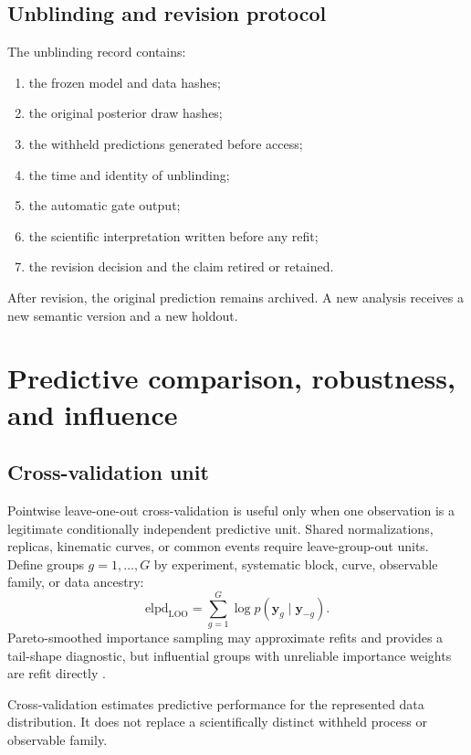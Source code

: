 \documentclass[11pt]{article}
\newcommand{\LOO}{\ensuremath{\mathrm{LOO}}}
\begin{document}
\subsection{Unblinding and revision protocol}

The unblinding record contains:
\begin{enumerate}
\item the frozen model and data hashes;
\item the original posterior draw hashes;
\item the withheld predictions generated before access;
\item the time and identity of unblinding;
\item the automatic gate output;
\item the scientific interpretation written before any refit;
\item the revision decision and the claim retired or retained.
\end{enumerate}
After revision, the original prediction remains archived.  A new analysis
receives a new semantic version and a new holdout.

\section{Predictive comparison, robustness, and influence}
\label{sec:model-comparison}

\subsection{Cross-validation unit}

Pointwise leave-one-out cross-validation is useful only when one observation
is a legitimate conditionally independent predictive unit.  Shared
normalizations, replicas, kinematic curves, or common events require
leave-group-out units.  Define groups \(g=1,\ldots,G\) by experiment,
systematic block, curve, observable family, or data ancestry:
\begin{equation}
 \mathrm{elpd}_{\LOO}
 =
 \sum_{g=1}^{G}
 \log
 p(
 \bm y_g
 \mid
 \bm y_{-g}
 ).
 \label{eq:group-loo}
\end{equation}
Pareto-smoothed importance sampling may approximate refits and provides a
tail-shape diagnostic, but influential groups with unreliable importance
weights are refit directly \cite{VehtariLOO2017,VehtariPSIS2024}.

Cross-validation estimates predictive performance for the represented data
distribution.  It does not replace a scientifically distinct withheld process
or observable family.
\end{document}
